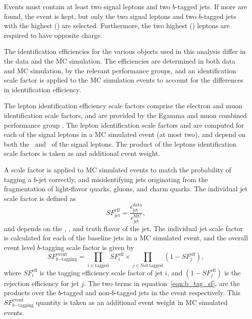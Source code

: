 Events must contain at least two signal leptons and two $b$-tagged jets.
If more are found, the event is kept, but only the two signal leptons and two
$b$-tagged jets with the highest \ET(\pt) are selected.
Furthermore, the two highest \ET(\pt) leptons are required to have opposite charge.

The identification efficiencies for the various objects used in this analysis
differ in the data and the MC simulation.
The efficiencies are determined in both data and MC simulation, by the relevant
performance groups, and an identification scale factor is applied to the MC
simulation events to account for the differences in identification efficiency.

The lepton identification efficiency scale factors comprise the electron and
muon identification scale factors, and are provided by the Egamma and muon
combined performance group \cite{egamma2014,Aad:2014rra}.
The lepton identification scale factors and are computed for each of the signal
leptons in a MC simulated event (at most two), and depend on both the
\pt\ and \eta\ of the signal leptons.
The product of the leptons identification scale factors is taken as and additional event weight.

A scale factor is applied to MC simulated events to match the probability of
tagging a $b$-jet correctly, and misidentifying jets originating from the
fragmentation of light-flavor quarks, gluons, and charm quarks. 
The individual jet scale factor is defined as
\begin{equation}
  SF_\mathrm{jet}^\mathrm{eff}
  =
  \frac{\epsilon_\mathrm{jet}^\mathrm{data}}{\epsilon_\mathrm{jet}^\mathrm{MC}},
\end{equation}
and depends on the \et, \eta, and truth flavor of the jet.
The individual jet scale factor is calculated for each of the baseline jets in
a MC simulated event, and the overall event level $b$-tagging scale factor is
given by 
\begin{equation}
  \label{eqn:b_tag_sf}
  SF_{b\mathrm{-tagging}}^\mathrm{event} =
  \prod_{i \in \mathrm{tagged}}
  SF_i^\mathrm{eff}
  \times
  \prod_{j \in \mathrm{Not~tagged}}
  (1- SF_j^\mathrm{eff}),
\end{equation}
where $SF_i^\mathrm{eff}$ is the tagging efficiency scale factor of jet $i$, and
$(1- SF_j^\mathrm{eff})$ is the rejection efficiency for jet $j$.
The two terms in equation~\ref{eqn:b_tag_sf}, are the products over the
$b$-tagged and non-$b$-tagged jets in the event respectively.
This $SF_{b\mathrm{-tagging}}^\mathrm{event}$ quantity is taken as an additional
event weight in MC simulated events.

